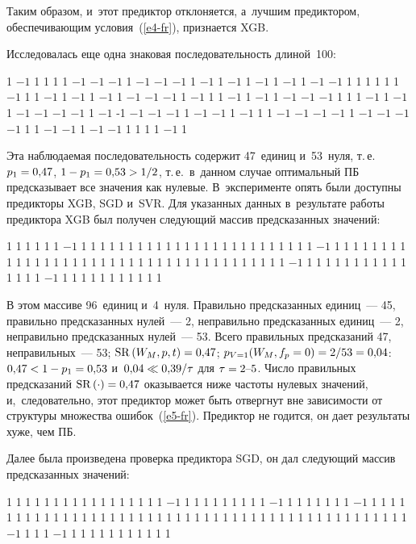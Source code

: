 \begin{multicols}{2}
  Таким образом, и~этот предиктор отклоняется, а~лучшим предиктором, 
обеспечивающим условия~(\ref{e4-fr}), признается XGB.
  
  Исследовалась еще одна знаковая последовательность длиной~100: 

 1 $-1$ 1 1 1 1 $-1$ $-1$ $-1$ 1 $-1$ $-1$ $-1$ 1 $-1$ 1 $-1$ 1 $-1$ 1 $-1$ 
1 $-1$ $-1$ 1 1 1 1 
1 1 $-1$ 1 1 $-1$ 1 $-1$ 1 $-1$ 1 $-1$ $-1$ $-1$ 1 $-1$ 1 1 $-1$ 1 $-1$ 1 $-1$ 
$-1$ $-1$ 1 1 1 
$-1$ 1 $-1$ 1 $-1$ $-1$ $-1$ $-1$ 1 $-1$ -1 $-1$ $-1$ 
$-1$ 1 $-1$ $-1$ 1 $-1$ 1 1 $-1$ $-1$ $-1$ $-1$ 1 $-1$ $-1$ 
$-1$ $-1$ 1 1 $-1$ $-1$ 1 $-1$ $-1$ 1 1 1 1 $-1$ 1

\vspace*{2pt}

\noindent
  Эта наблюдаемая последовательность содержит 47~единиц и~53~нуля, т.\,е.\
   $p_1 \hm= 0{,}47$, $1\hm- p_1 \hm= 0{,}53 \hm> 1/2$, т.\,е.\ в~данном 
случае оптимальный ПБ предсказывает все значения как нулевые. 
В~эксперименте опять были доступны предикторы XGB, SGD и~SVR. Для 
указанных данных в~результате работы предиктора XGB был получен 
следующий массив предсказанных значений:
  
   1 1 1 1 1 1 $-1$ 1 1 1 1 1 1 1 1 1 1 1 1 1 1 1 1 1 1 1 1 1 1 1 1 1 $-1$ 1 1 1 1 1 1 1 1 1 1 1 1 1 1 
1 1 1 1 1 1 1 1 1 1 1 1 1 1 1 1 1 1 1 1 1 1 1 1 $-1$ 1 1 1 1 1 1 1 1 1 1 1 1 1 1 1 $-1$ 1 1 1 1 1 1 1 
1 1 1 1

\vspace*{2pt}
  
  \noindent
  В этом массиве 96~единиц и~4~нуля. Правильно предсказанных единиц~--- 
  45, правильно предсказанных нулей~--- 2, неправильно предсказанных 
единиц~--- 2, неправильно предсказанных нулей~--- 53. Всего правильных 
предсказаний 47, неправильных~--- 53; $\mathrm{SR}\,(W_M, p, t)\hm = 
0{,}47$; $p_{V=1}(W_M, f_p= 0)\hm = 2/53 \hm= 0{,}04$: $0{,}47 \hm< 1\hm-
 p_1 \hm= 0{,}53$ и~$0{,}04 \hm\ll 0{,}39/\tau$ для $\tau\hm = 2\mbox{--}5$. 
Число правильных предсказаний $\mathrm{SR}\,(\cdot) \hm= 0{,}47$
оказывается ниже частоты нулевых значений, и,~следовательно, этот 
предиктор может быть отвергнут вне зависимости от структуры множества 
ошибок~(\ref{e5-fr}). Предиктор не годится, он дает результаты хуже, чем 
ПБ.
  
  Далее была произведена проверка предиктора SGD, он дал следующий 
массив предсказанных значений: 
 
   1 1  1 1  1 1 1  1   1 1  1  1  1  1  1  1  1  $-1$ 1  1 
 1  1 1  1  1  1 1  $-1$  1 1 1  1  1  1  1  $-1$ 1 1 1  1  1 
 1  1 1  1  1  1 1  1  1  1  1  1  1  1  1 1  1  1 1  1 1
 1  1 1 1  1 1 1 1  1  1  1  1  1 1  1  1  1 1 1  1 1
 $-1$ 1 1 1 $-1$ 1  1 1 1 1 1  1 1 1 1 1
 

\end{multicols}
